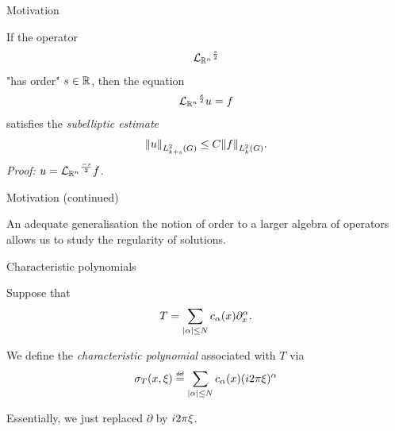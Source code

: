 \documentclass{beamer}
\begin{document}
\begin{frame}
    {Motivation}

    If the operator
    \begin{align*}
        {\Laplacian [\R^n]}^\frac s 2
    \end{align*}
    "has order" $s \in \R$,
    \pause
    then the equation
    \begin{align*}
        {\Laplacian [\R^n]}^\frac s 2 u = f
    \end{align*}
    satisfies the \emph{subelliptic estimate}
    \begin{align*}
        \norm [\Sobolev {k + s}] u
        \leq C \norm [\Sobolev k] f.
    \end{align*}
    \pause
    \emph{Proof:} $u = {\Laplacian [\R^n]}^\frac {-s} 2 f$.
\end{frame}

\begin{frame}
    {Motivation (continued)}

    An adequate generalisation the notion of order to a larger algebra of operators allows us to study the regularity of solutions.
\end{frame}

\begin{frame}
    {Characteristic polynomials}

    \begin{definition}
        Suppose that
        \begin{align*}
            T =
            \sum_{\abs \alpha \leq N}
            c_\alpha(x)
            \iD{x^\alpha}.
        \end{align*}

        We define the \emph{characteristic polynomial}
        associated with $T$ via
        \begin{align*}
            \sigma_T(x, \xi) \defeq
            \sum_{\abs \alpha \leq N}
            c_\alpha(x)
            (\i \turn \xi)^\alpha
        \end{align*}
    \end{definition}

    \pause
    Essentially, we just replaced $\partial$ by $\i \turn \xi$.
\end{frame}
\end{document}
